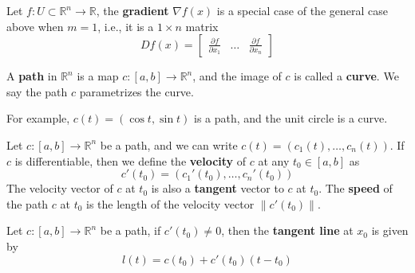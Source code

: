 \documentclass[openany]{book}
\newcommand{\R}{\mathbb{R}}
\begin{document}
\begin{defn}[graident]
    Let $f:U\subset\R^n\to\R$, the \textbf{gradient} $\nabla f(x)$ is a special case of the general case above when $m=1$, i.e., it is a $1\times n$ matrix 
    \begin{equation*}
        Df(x)=\begin{bmatrix}
            \frac{\partial f}{\partial x_1}&\dots&\frac{\partial f}{\partial x_n}
        \end{bmatrix}
    \end{equation*}
\end{defn}


\begin{defn}
    A \textbf{path} in $\R^n$ is a map $c:[a,b]\to\R^n$, and the image of $c$ is called a \textbf{curve}. We say the path $c$ parametrizes the curve. 

    \noindent For example, $c(t)=(\cos t, \sin t)$ is a path, and the unit circle is a curve.
\end{defn}


\begin{defn}
    Let $c:[a,b]\to\R^n$ be a path, and we can write $c(t)=(c_1(t), \dots, c_n(t))$. If $c$ is differentiable, then we define the \textbf{velocity} of $c$ at any $t_0\in [a,b]$ as 
    \begin{equation*}
        c'(t_0)=\left(c_1'(t_0), \dots, c_n'(t_0)\right)
    \end{equation*}
    The velocity vector of $c$ at $t_0$ is also a \textbf{tangent} vector to $c$ at $t_0$. The \textbf{speed} of the path $c$ at $t_0$ is the length of the velocity vector $\|c'(t_0)\|$.
\end{defn}

\begin{defn}\label{tangent path}
    Let $c:[a,b]\to\R^n$ be a path, if $c'(t_0)\neq 0$, then the \textbf{tangent line} at $x_0$ is given by 
    \begin{equation*}
        l(t)=c(t_0)+c'(t_0)(t-t_0)
    \end{equation*}
\end{defn}
\end{document}
